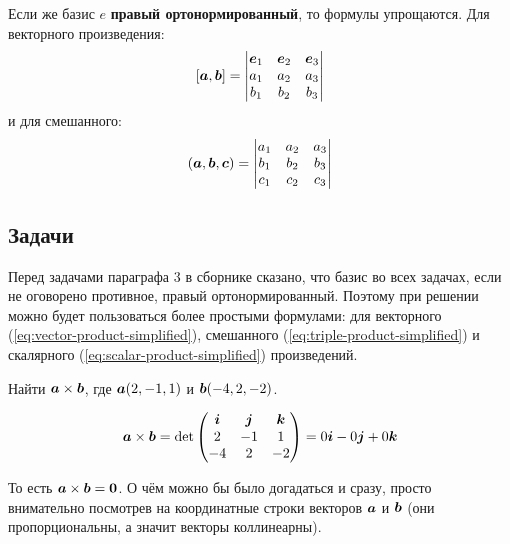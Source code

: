 \documentclass[a4paper,12pt]{article}
\begin{document}
  Если же базис $e$ \textbf{правый ортонормированный}, то формулы упрощаются.
  Для векторного произведения:
  \begin{equation}\label{eq:vector-product-simplified}
    [\boldsymbol a, \boldsymbol b] = \begin{vmatrix}
      \boldsymbol e_1 & \boldsymbol e_2 & \boldsymbol e_3\\
      a_1 & a_2 & a_3\\
      b_1 & b_2 & b_3
    \end{vmatrix}
  \end{equation}
  и для смешанного:
  \begin{equation}\label{eq:triple-product-simplified}
    (\boldsymbol a, \boldsymbol b, \boldsymbol c) = \begin{vmatrix}
      a_1 & a_2 & a_3\\
      b_1 & b_2 & b_3\\
      c_1 & c_2 & c_3
    \end{vmatrix}
  \end{equation}
  
  
  \subsection{Задачи}
  
  Перед задачами параграфа $3$ в сборнике сказано, что базис во всех задачах, если не оговорено противное, правый ортонормированный.
  Поэтому при решении можно будет пользоваться более простыми формулами: для векторного (\ref{eq:vector-product-simplified}), смешанного (\ref{eq:triple-product-simplified}) и скалярного (\ref{eq:scalar-product-simplified}) произведений.
  
  
  \begin{problem}[3.1(2)]
    Найти $\boldsymbol a \times \boldsymbol b$, где $\boldsymbol a(2, -1, 1)$ и $\boldsymbol b(-4, 2, -2)$.  %
  \end{problem}
  
  \begin{solution}
    \[
      \boldsymbol a \times \boldsymbol b = \det \begin{pmatrix}
        \boldsymbol i & \boldsymbol j & \boldsymbol k\\
        2      & -1     & 1\\
        -4     & 2      & -2
      \end{pmatrix}
      = 0 \boldsymbol i - 0 \boldsymbol j + 0 \boldsymbol k
    \]
    
    То есть $\bds a \hm\times \bds b \hm= \bds 0$.
    О чём можно бы было догадаться и сразу, просто внимательно посмотрев на координатные строки векторов $\boldsymbol a$ и $\boldsymbol b$ (они пропорциональны, а значит векторы коллинеарны).
  \end{solution}
  
\end{document}
